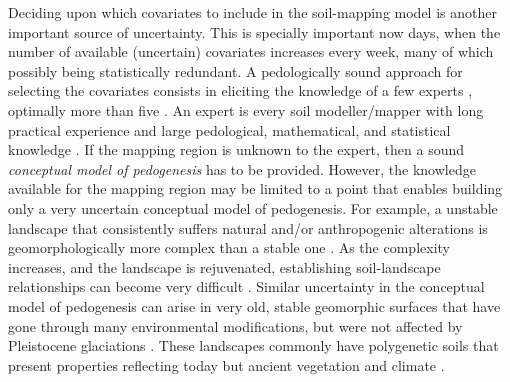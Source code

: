 Deciding upon which covariates to include in the soil-mapping model is another important source of 
uncertainty. This is specially important now days, when the number of available (uncertain) 
covariates increases every week, many of which possibly being statistically redundant. A 
pedologically sound approach for selecting the covariates consists in eliciting the knowledge of a 
few experts \citep{LarkEtAl2007b}, optimally more than five \citep{MeyerEtAl2001}. An expert is 
every soil modeller/mapper with long practical experience and large pedological, mathematical, and 
statistical knowledge \citep{MeyerEtAl2001}. If the mapping region is unknown to the expert, then
a sound \textit{conceptual model of pedogenesis} has to be provided. However, the knowledge 
available for the mapping region may be limited to a point that enables building only a very 
uncertain conceptual model of pedogenesis. For example, a unstable landscape that consistently 
suffers natural and/or anthropogenic alterations is geomorphologically more complex than a stable
one \citep{Schumm1979}. As the complexity increases, and the landscape is rejuvenated, establishing 
soil-landscape relationships can become very difficult \citep{StreckEtAl2008}. Similar uncertainty 
in the conceptual model of pedogenesis can arise in very old, stable geomorphic surfaces that have 
gone through many environmental modifications, but were not affected by Pleistocene glaciations 
\citep{McKenzieEtAl2000a}. These landscapes commonly have polygenetic soils that present properties
reflecting today but ancient vegetation and climate \citep{PainEtAl1995, Ker1998a}.

